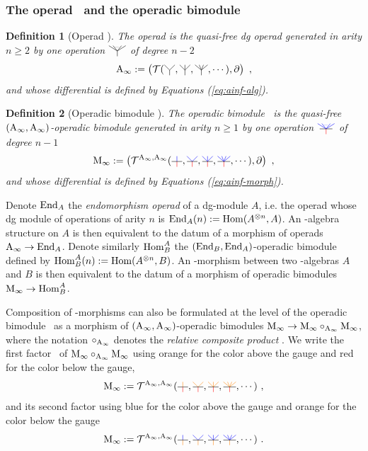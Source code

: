 \documentclass[twoside, 12pt]{amsart}
\newtheorem{definition}{Definition}[section]
\theoremstyle{remark}
\begin{document}
\subsubsection{The operad \Ainf\ and the operadic bimodule \Minf} \label{sss:operad-ainf-operadic-bimod-minf}

\begin{definition}[Operad \Ainf]
The \emph{operad \Ainf} is the quasi-free dg operad generated in arity $n \geq 2$ by one operation $\arbreop{0.15}$ of degree $n-2$ 
\[ \Ainf := \left( \mathcal{T}( \arbreopdeux , \arbreoptrois, \arbreopquatre , \cdots ) , \partial \right) \ , \]
and whose differential is defined by Equations (\ref{eq:ainf-alg}).
\end{definition}

\begin{definition}[Operadic bimodule \Minf]
The operadic bimodule \Minf\ is the quasi-free $(\mathrm{A}_\infty ,\mathrm{A}_\infty )$-operadic bimodule generated in arity $n \geq 1$ by one operation $\arbreopmorph{0.15}$ of degree $n-1$ 
\[ \Minf :=  \left( \mathcal{T}^{\Ainf , \Ainf}(\arbreopunmorph , \arbreopdeuxmorph , \arbreoptroismorph , \arbreopquatremorph , \cdots ) , \partial \right) \ , \]
and whose differential is defined by Equations (\ref{eq:ainf-morph}).
\end{definition}

Denote $\mathrm{End}_A$ the \textit{endomorphism operad} of a dg-module $A$, i.e. the operad whose dg module of operations of arity $n$ is $\mathrm{End}_A(n) := \mathrm{Hom} (A^{\otimes n},A)$. An \Ainf -algebra structure on $A$ is then equivalent to the datum of a morphism of operads $\mathrm{A}_\infty \rightarrow \mathrm{End}_A$. Denote similarly $\mathrm{Hom}^A_B$ the $(\mathrm{End}_B , \mathrm{End}_A)$-operadic bimodule defined by $ \mathrm{Hom}^A_B(n) := \mathrm{Hom} (A^{\otimes n},B)$. An \Ainf -morphism between two \Ainf -algebras $A$ and $B$ is then equivalent to the datum of a morphism of operadic bimodules $\mathrm{M}_\infty \rightarrow \mathrm{Hom}^A_B$.

Composition of \Ainf -morphisms can also be formulated at the level of the operadic bimodule \Minf\ as a morphism of $(\mathrm{A}_\infty , \mathrm{A}_\infty)$-operadic bimodules $\mathrm{M}_\infty \rightarrow \mathrm{M}_\infty \circ_{\mathrm{A}_\infty} \mathrm{M}_\infty$, where the notation $\circ_{\mathrm{A}_\infty}$ denotes the \emph{relative composite product} \cite[Section 11.2.1]{LodayVallette12}.
We write the first factor \Minf\ of $\mathrm{M}_\infty \circ_{\mathrm{A}_\infty} \mathrm{M}_\infty$ using orange for the color above the gauge and red for the color below the gauge,
\[ \Minf :=  \mathcal{T}^{\Ainf , \Ainf}(\arbreopunmorphcompdeux , \arbreopdeuxmorphcompdeux , \arbreoptroismorphcompdeux , \arbreopquatremorphcompdeux , \cdots ) \ , \]
and its second factor using blue for the color above the gauge and orange for the color below the gauge
\[ \Minf :=  \mathcal{T}^{\Ainf , \Ainf}(\arbreopunmorphcompun , \arbreopdeuxmorphcompun , \arbreoptroismorphcompun , \arbreopquatremorphcompun , \cdots ) \ . \]
\end{document}
